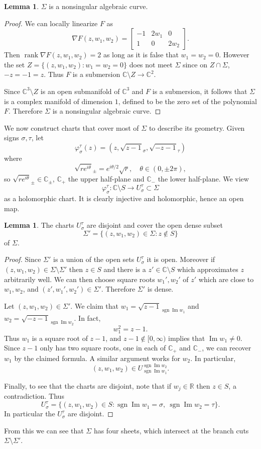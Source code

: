 \documentclass[12pt]{report}
\newcommand{\RR}{\mathbb{R}}
\newcommand{\CC}{\mathbb{C}}
\DeclareMathOperator{\sgn}{sgn}
\DeclareMathOperator{\rank}{rank}
\renewcommand{\Im}{\operatorname{Im}}
\theoremstyle{definition}
\newtheorem{lemma}[theorem]{Lemma}
\begin{document}
\begin{lemma}
$\Sigma$ is a nonsingular algebraic curve.
\end{lemma}
\begin{proof}
We can locally linearize $F$ as
$$\nabla F(z, w_1, w_2) = \begin{bmatrix}-1 & 2w_1 & 0\\1 & 0 & 2w_2\end{bmatrix}.$$
Then $\rank \nabla F(z, w_1, w_2) = 2$ as long as it is false that $w_1 = w_2 = 0$.
However the set $Z = \{(z, w_1, w_2): w_1 = w_2 = 0\}$ does not meet $\Sigma$ since on $Z \cap \Sigma$, $-z = -1 = z$.
Thus $F$ is a submersion $\CC \setminus Z \to \CC^2$.

Since $\CC^3 \setminus Z$ is an open submanifold of $\CC^3$ and $F$ is a submersion, it follows that $\Sigma$ is a complex manifold of dimension $1$, defined to be the zero set of the polynomial $F$.
Therefore $\Sigma$ is a nonsingular algebraic curve.
\end{proof}
We now construct charts that cover most of $\Sigma$ to describe its geometry. Given signs $\sigma,\tau$, let
$$\varphi_\sigma^\tau(z) = (z, \sqrt{z-1}_\sigma, \sqrt{-z-1}_\tau)$$
where
$$\sqrt{re^{i\theta}}_\pm = e^{i\theta/2}\sqrt r,\quad\theta \in (0, \pm 2\pi),$$
so $\sqrt{re^{i\theta}}_\pm \in \CC_\pm$, $\CC_+$ the upper half-plane and $\CC_-$ the lower half-plane.
We view
$$\varphi_\sigma^\tau: \CC \setminus S \to U_\sigma^\tau \subset \Sigma$$
as a holomorphic chart. It is clearly injective and holomorphic, hence an open map.
\begin{lemma}
The charts $U_\sigma^\tau$ are disjoint and cover the open dense subset
$$\Sigma' = \{(z, w_1, w_2) \in \Sigma: z \notin S\}$$
of $\Sigma$.
\end{lemma}
\begin{proof}
Since $\Sigma'$ is a union of the open sets $U_\sigma^\tau$ it is open. Moreover if $(z, w_1, w_2) \in \Sigma \setminus \Sigma'$ then $z \in S$ and there is a $z' \in \CC \setminus S$ which approximates $z$ arbitrarily well. We can then choose square roots $w_1',w_2'$ of $z'$ which are close to $w_1,w_2$, and $(z', w_1', w_2') \in \Sigma'$. Therefore $\Sigma'$ is dense.

Let $(z, w_1, w_2) \in \Sigma'$. We claim that $w_1 = \sqrt{z-1}_{\sgn \Im w_1}$ and $w_2 = \sqrt{-z-1}_{\sgn \Im w_2}$.
In fact,
$$w_1^2 = z - 1.$$
Thus $w_1$ is a square root of $z - 1$, and $z - 1 \notin [0, \infty)$ implies that $\Im w_1 \neq 0$.
Since $z - 1$ only has two square roots, one in each of $\CC_+$ and $\CC_-$, we can recover $w_1$ by the claimed formula.
A similar argument works for $w_2$.
In particular,
$$(z, w_1, w_2) \in U_{\sgn \Im w_1}^{\sgn \Im w_2}.$$

Finally, to see that the charts are disjoint, note that if $w_j \in \RR$ then $z \in S$, a contradiction. Thus
$$U_\sigma^\tau = \{(z, w_1, w_2) \in S: \sgn \Im w_1 = \sigma,~\sgn \Im w_2 = \tau\}.$$
In particular the $U_\sigma^\tau$ are disjoint.
\end{proof}
From this we can see that $\Sigma$ has four sheets, which intersect at the branch cuts $\Sigma \setminus \Sigma'$.
\end{document}
